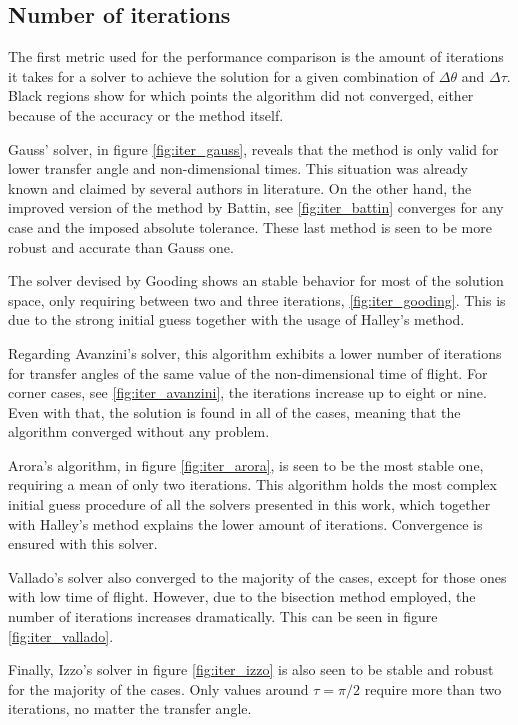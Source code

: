 \subsection{Number of iterations}

The first metric used for the performance comparison is the amount of iterations
it takes for a solver to achieve the solution for a given combination of $\Delta
  \theta$ and $\Delta \tau$. Black regions show for which points the algorithm did
not converged, either because of the accuracy or the method itself.

Gauss' solver, in figure \ref{fig:iter_gauss}, reveals that the method is only
valid for lower transfer angle and non-dimensional times. This situation was
already known and claimed by several authors in literature. On the other hand,
the improved version of the method by Battin, see \ref{fig:iter_battin}
converges for any case and the imposed absolute tolerance. These last method is
seen to be more robust and accurate than Gauss one.

The solver devised by Gooding shows an stable behavior for most of the solution
space, only requiring between two and three iterations, \ref{fig:iter_gooding}.
This is due to the strong initial guess together with the usage of Halley's
method.

Regarding Avanzini's solver, this algorithm exhibits a lower number of
iterations for transfer angles of the same value of the non-dimensional time of
flight. For corner cases, see \ref{fig:iter_avanzini}, the iterations increase up
to eight or nine. Even with that, the solution is found in all of the cases,
meaning that the algorithm converged without any problem.

Arora's algorithm, in figure \ref{fig:iter_arora}, is seen to be the most stable
one, requiring a mean of only two iterations. This algorithm holds the most
complex initial guess procedure of all the solvers presented in this work, which
together with Halley's method explains the lower amount of iterations.
Convergence is ensured with this solver.

Vallado's solver also converged to the majority of the cases, except for those
ones with low time of flight. However, due to the bisection method employed, the
number of iterations increases dramatically. This can be seen in figure
\ref{fig:iter_vallado}.

Finally, Izzo's solver in figure \ref{fig:iter_izzo} is also seen to be stable
and robust for the majority of the cases. Only values around $\tau=\pi/2$
require more than two iterations, no matter the transfer angle.


